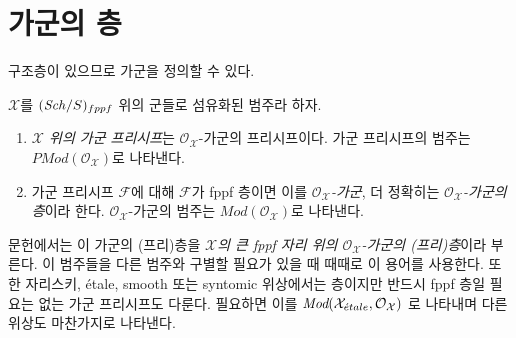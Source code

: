 \section{가군의 층}
\label{section-modules}

\noindent
구조층이 있으므로 가군을 정의할 수 있다.

\begin{definition}
\label{definition-modules}
$\mathcal{X}$를 $(\mathit{Sch}/S)_{fppf}$ 위의 군들로 섬유화된 범주라 하자.
\begin{enumerate}
\item {\it $\mathcal{X}$ 위의 가군 프리시프}는
$\mathcal{O}_\mathcal{X}$-가군의 프리시프이다. 가군 프리시프의 범주는
$\textit{PMod}(\mathcal{O}_\mathcal{X})$로 나타낸다.
\item 가군 프리시프 $\mathcal{F}$에 대해 $\mathcal{F}$가 fppf 층이면 이를
{\it $\mathcal{O}_\mathcal{X}$-가군}, 더 정확히는
{\it $\mathcal{O}_\mathcal{X}$-가군의 층}이라 한다.
$\mathcal{O}_\mathcal{X}$-가군의 범주는
$\textit{Mod}(\mathcal{O}_\mathcal{X})$로 나타낸다.
\end{enumerate}
\end{definition}

\noindent
문헌에서는 이 가군의 (프리)층을
{\it $\mathcal{X}$의 큰 fppf 자리 위의 $\mathcal{O}_\mathcal{X}$-가군의
(프리)층}이라 부른다. 이 범주들을 다른 범주와 구별할 필요가 있을 때
때때로 이 용어를 사용한다. 또한 자리스키, \'etale, smooth 또는
syntomic 위상에서는 층이지만 반드시 fppf 층일 필요는 없는 가군
프리시프도 다룬다. 필요하면 이를
$\textit{Mod}(\mathcal{X}_{\acute{e}tale}, \mathcal{O}_\mathcal{X})$
로 나타내며 다른 위상도 마찬가지로 나타낸다.

